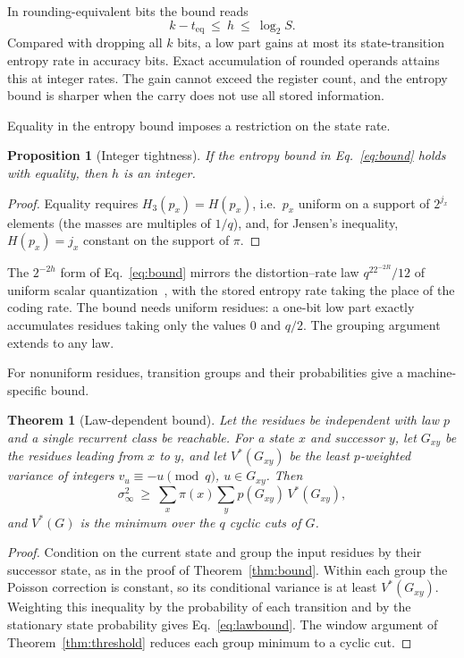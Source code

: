 \documentclass[preprint,12pt,numbers]{elsarticle}
\newtheorem{theorem}{Theorem}
\newtheorem{proposition}{Proposition}
\theoremstyle{definition}
\begin{document}
In rounding-equivalent bits the bound reads
\begin{equation}
k-t_{\mathrm{eq}}\ \le\ h\ \le\ \log_2S .
\label{eq:bits}
\end{equation}
Compared with dropping all $k$ bits, a low part gains at most its
state-transition entropy rate in accuracy bits. Exact accumulation of
rounded operands attains this at integer rates. The gain cannot exceed
the register count, and the entropy bound is sharper when the carry does not
use all stored information.

Equality in the entropy bound imposes a restriction on the state rate.
\begin{proposition}[Integer tightness]\label{prop:integer}
If the entropy bound in Eq.~\eqref{eq:bound} holds with equality, then $h$ is
an integer.
\end{proposition}
\begin{proof}
Equality requires $H_3(p_x)=H(p_x)$, i.e.\ $p_x$ uniform on a support of
$2^{j_x}$ elements (the masses are multiples of $1/q$), and, for Jensen's
inequality, $H(p_x)=j_x$ constant on the support of $\pi$.
\end{proof}


The $2^{-2h}$ form of Eq.~\eqref{eq:bound} mirrors the distortion--rate
law $q^22^{-2R}/12$ of uniform scalar quantization~\cite{gray1998quant},
with the stored entropy rate taking the place of the coding rate. The bound
needs uniform residues: a one-bit low part exactly accumulates residues
taking only the values $0$ and $q/2$. The grouping argument extends to
any law.

For nonuniform residues, transition groups and their probabilities give a
machine-specific bound.
\begin{theorem}[Law-dependent bound]\label{thm:lawbound}
Let the residues be independent with law $p$ and a single recurrent class be
reachable. For a state $x$ and successor $y$, let $G_{xy}$ be the residues
leading from $x$ to $y$, and let $V^\ast(G_{xy})$ be the least $p$-weighted
variance of integers $v_u\equiv-u\pmod q$, $u\in G_{xy}$. Then
\begin{equation}
\sigma^2_\infty\ \ge\ \sum_x\pi(x)\sum_y p(G_{xy})\,V^\ast(G_{xy}),
\label{eq:lawbound}
\end{equation}
and $V^\ast(G)$ is the minimum over the $q$ cyclic cuts of $G$.
\end{theorem}
\begin{proof}
Condition on the current state and group the input residues by their
successor state, as in the proof of Theorem~\ref{thm:bound}. Within each
group the Poisson correction is constant, so its conditional variance is
at least $V^\ast(G_{xy})$. Weighting this inequality by the probability of
each transition and by the stationary state probability gives
Eq.~\eqref{eq:lawbound}. The window argument of
Theorem~\ref{thm:threshold} reduces each group minimum to a cyclic cut.
\end{proof}
\end{document}
